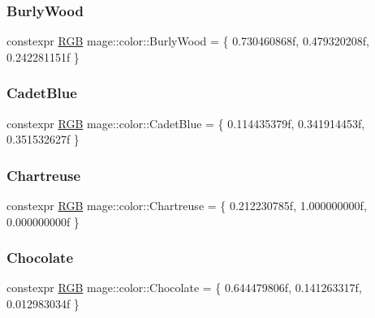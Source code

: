 \subsubsection{\texorpdfstring{Burly\+Wood}{BurlyWood}}
{\footnotesize\ttfamily constexpr \mbox{\hyperlink{structmage_1_1_r_g_b}{R\+GB}} mage\+::color\+::\+Burly\+Wood = \{ 0.\+730460868f, 0.\+479320208f, 0.\+242281151f \}}

\mbox{\label{namespacemage_1_1color_a9db1c95bad4c8f3a056b2b1b09bd1e90}} 
\subsubsection{\texorpdfstring{Cadet\+Blue}{CadetBlue}}
{\footnotesize\ttfamily constexpr \mbox{\hyperlink{structmage_1_1_r_g_b}{R\+GB}} mage\+::color\+::\+Cadet\+Blue = \{ 0.\+114435379f, 0.\+341914453f, 0.\+351532627f \}}

\mbox{\label{namespacemage_1_1color_a4d4898d5a83df8e62ac4d1062771f710}} 
\subsubsection{\texorpdfstring{Chartreuse}{Chartreuse}}
{\footnotesize\ttfamily constexpr \mbox{\hyperlink{structmage_1_1_r_g_b}{R\+GB}} mage\+::color\+::\+Chartreuse = \{ 0.\+212230785f, 1.\+000000000f, 0.\+000000000f \}}

\mbox{\label{namespacemage_1_1color_a19707250aad8c877717355fac97779d6}} 
\subsubsection{\texorpdfstring{Chocolate}{Chocolate}}
{\footnotesize\ttfamily constexpr \mbox{\hyperlink{structmage_1_1_r_g_b}{R\+GB}} mage\+::color\+::\+Chocolate = \{ 0.\+644479806f, 0.\+141263317f, 0.\+012983034f \}}

\mbox{\label{namespacemage_1_1color_a01bc4f2d453366cf9af890f0abb94738}} 

